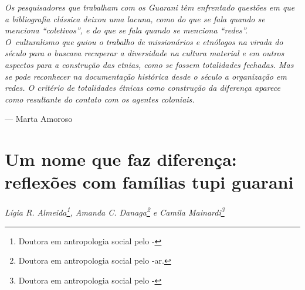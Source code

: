 \clearpage

\vspace*{\fill}

\begin{flushleft}
\begin{minipage}[c]{0.85\textwidth}
\raggedright
\footnotesize
\emph{Os pesquisadores que trabalham com os Guarani têm enfrentado questões em
que a bibliografia clássica deixou uma lacuna, como do que se fala
quando se menciona ``coletivos'', e do que se fala quando se menciona
``redes''. O~culturalismo que guiou o trabalho de missionários e etnólogos
na virada do século  para o  buscava recuperar a diversidade na
cultura material e em outros aspectos para a construção das etnias,
como se fossem totalidades fechadas. Mas se pode reconhecer na
documentação histórica desde o século  a organização em redes. O
critério de totalidades étnicas como construção da diferença aparece
como resultante do contato com os agentes coloniais.}

\smallskip
\hspace*{\fill}--- Marta Amoroso
\end{minipage}
\end{flushleft}

\chapter{Um nome que faz diferença: reflexões com famílias tupi guarani}
\begin{flushright}
\emph{Lígia R. Almeida\footnote{Doutora em antropologia social pelo
-}, Amanda C. Danaga\footnote{Doutora em antropologia
social pelo -ar.} e Camila Mainardi\footnote{Doutora em antropologia social pelo -}}
\end{flushright}
\medskip
%

